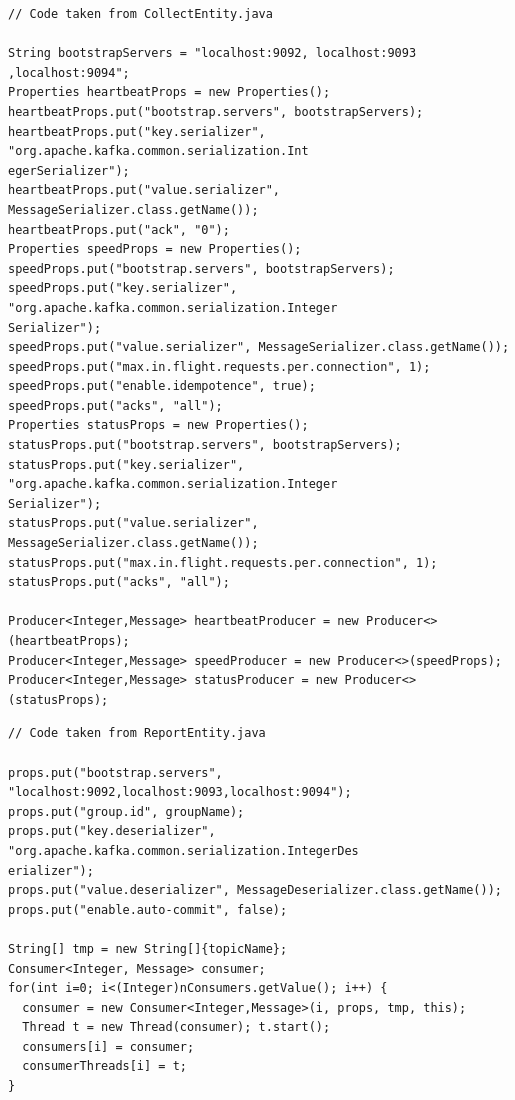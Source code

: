 \documentclass[12pt]{article}
\begin{document}
\begingroup
\fontsize{9pt}{10pt}\selectfont
\begin{verbatim}
// Code taken from CollectEntity.java

String bootstrapServers = "localhost:9092, localhost:9093 ,localhost:9094";
Properties heartbeatProps = new Properties();
heartbeatProps.put("bootstrap.servers", bootstrapServers);
heartbeatProps.put("key.serializer", "org.apache.kafka.common.serialization.Int
egerSerializer");
heartbeatProps.put("value.serializer", MessageSerializer.class.getName());
heartbeatProps.put("ack", "0");
Properties speedProps = new Properties();
speedProps.put("bootstrap.servers", bootstrapServers);
speedProps.put("key.serializer", "org.apache.kafka.common.serialization.Integer
Serializer");
speedProps.put("value.serializer", MessageSerializer.class.getName());
speedProps.put("max.in.flight.requests.per.connection", 1);
speedProps.put("enable.idempotence", true);
speedProps.put("acks", "all");
Properties statusProps = new Properties();
statusProps.put("bootstrap.servers", bootstrapServers);
statusProps.put("key.serializer", "org.apache.kafka.common.serialization.Integer
Serializer");
statusProps.put("value.serializer", MessageSerializer.class.getName());
statusProps.put("max.in.flight.requests.per.connection", 1);
statusProps.put("acks", "all");

Producer<Integer,Message> heartbeatProducer = new Producer<>(heartbeatProps);
Producer<Integer,Message> speedProducer = new Producer<>(speedProps);
Producer<Integer,Message> statusProducer = new Producer<>(statusProps);
\end{verbatim}
\endgroup

\begingroup
\fontsize{9pt}{10pt}\selectfont
\begin{verbatim}
// Code taken from ReportEntity.java

props.put("bootstrap.servers", "localhost:9092,localhost:9093,localhost:9094");
props.put("group.id", groupName);
props.put("key.deserializer", "org.apache.kafka.common.serialization.IntegerDes
erializer");
props.put("value.deserializer", MessageDeserializer.class.getName());
props.put("enable.auto-commit", false);

String[] tmp = new String[]{topicName};
Consumer<Integer, Message> consumer;
for(int i=0; i<(Integer)nConsumers.getValue(); i++) {
  consumer = new Consumer<Integer,Message>(i, props, tmp, this);
  Thread t = new Thread(consumer); t.start();
  consumers[i] = consumer;
  consumerThreads[i] = t;
}
\end{verbatim}
\endgroup
\end{document}
